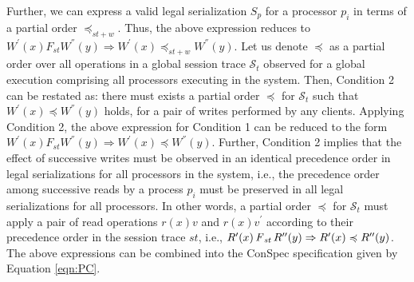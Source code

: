\documentclass[acmlarge, ,11pt]{acmart}
\begin{document}
  Further, we can express a valid legal serialization $S_p$ for a processor $p_i$ in terms of a partial order $\preccurlyeq_{\mathit{st}+w}$. Thus, the above expression reduces to $W^{'}(x) F_\mathit{st}  W^{''} (y) \Rightarrow W^{'}(x) \preccurlyeq_{\mathit{st}+w}  W^{''} (y) $.  %
  Let us denote $ \preccurlyeq$ %
  as a partial order over all operations in a global session trace $\mathcal{S}_t$ observed for  a global execution comprising all processors executing in the system.  Then, Condition 2 can be restated as: there must exists a partial order $\preccurlyeq$ for $\mathcal{S}_t$ such that $W^{'}(x) \preccurlyeq  W^{''} (y)$ holds, for a pair of writes performed by any clients. Applying Condition 2, the above expression for Condition 1 can be reduced to the form $W^{'}(x) F_\mathit{st}  W^{''} (y) \Rightarrow W^{'}(x) \preccurlyeq  W^{''} (y) $. Further, Condition 2 implies that the effect of successive writes must be observed in an identical precedence order in legal serializations for all processors in the system, i.e., the precedence order among successive reads by a process $p_i$ must be preserved in all legal serializations for all processors. In other words, a partial order $\preccurlyeq$  for $\mathcal{S}_t$ must apply a pair of read operations $r(x){v}$ and $r(x){v}^{'}$ according to their precedence order in the session trace $\mathit{st}$, i.e.,   $R'(x) \operatorname{\it F}_\mathit{st} R''(y)  \Rightarrow  R'(x) \preccurlyeq R''(y)$. The above expressions can be combined into the ConSpec specification given by Equation \ref{eqn:PC}. %
\end{document}
